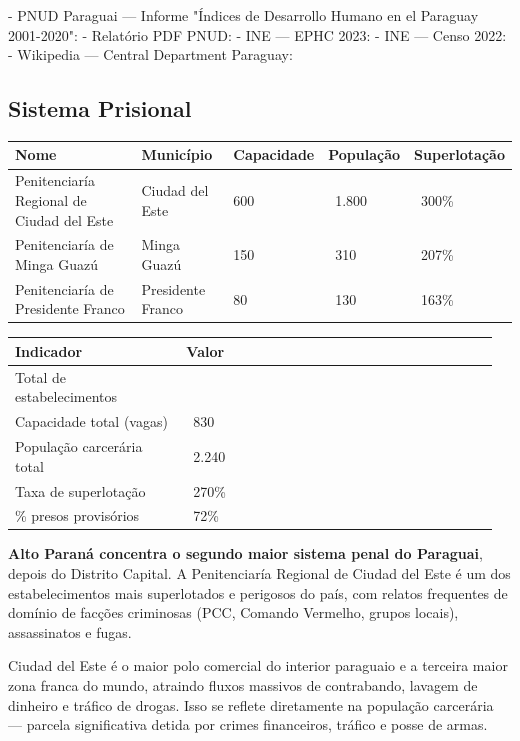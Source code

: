 - PNUD Paraguai --- Informe "Índices de Desarrollo Humano en el Paraguay 2001-2020": 
- Relatório PDF PNUD: 
- INE --- EPHC 2023: 
- INE --- Censo 2022: 
- Wikipedia --- Central Department Paraguay: 


\subsection{Sistema Prisional}



{\small
\setlength{\tabcolsep}{3pt}
\renewcommand{\arraystretch}{1.12}
{\small
\begin{tabularx}{\linewidth}{lXXXX}
\toprule
Nome & Município & Capacidade & População & Superlotação \\
\midrule
Penitenciaría Regional de Ciudad del Este & Ciudad del Este & 600 & ~1.800 & ~300\% \\
Penitenciaría de Minga Guazú & Minga Guazú & 150 & ~310 & ~207\% \\
Penitenciaría de Presidente Franco & Presidente Franco & 80 & ~130 & ~163\% \\
\bottomrule
\end{tabularx}
}
}


{\small
\setlength{\tabcolsep}{3pt}
\renewcommand{\arraystretch}{1.12}
\begin{tabularx}{\linewidth}{>{\raggedright\arraybackslash}p{0.34\linewidth} >{\raggedright\arraybackslash}p{0.62\linewidth}}
\toprule
Indicador & Valor \\
\midrule
Total de estabelecimentos & 3 \\
Capacidade total (vagas) & ~830 \\
População carcerária total & ~2.240 \\
Taxa de superlotação & ~270\% \\
\% presos provisórios & ~72\% \\
\bottomrule
\end{tabularx}
}


\textbf{Alto Paraná concentra o segundo maior sistema penal do Paraguai}, depois do Distrito Capital. A Penitenciaría Regional de Ciudad del Este é um dos estabelecimentos mais superlotados e perigosos do país, com relatos frequentes de domínio de facções criminosas (PCC, Comando Vermelho, grupos locais), assassinatos e fugas.

Ciudad del Este é o maior polo comercial do interior paraguaio e a terceira maior zona franca do mundo, atraindo fluxos massivos de contrabando, lavagem de dinheiro e tráfico de drogas. Isso se reflete diretamente na população carcerária --- parcela significativa detida por crimes financeiros, tráfico e posse de armas.

